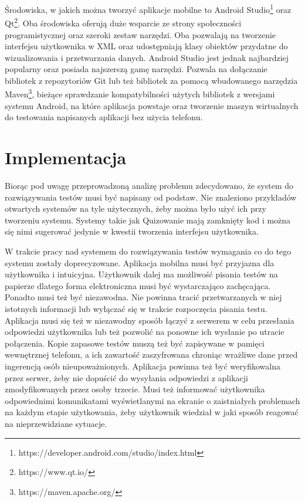 \documentclass{report}
\begin{document}
	Środowiska, w jakich można tworzyć aplikacje mobilne to Android Studio\footnote{https://developer.android.com/studio/index.html} oraz Qt\footnote{https://www.qt.io/}. Oba środowiska oferują duże wsparcie ze strony społeczności programistycznej oraz szeroki zestaw narzędzi. Oba pozwalają na tworzenie interfejsu użytkownika w XML oraz udostępniają klasy obiektów przydatne do wizualizowania i przetwarzania danych. Android Studio jest jednak najbardziej popularny oraz posiada najszerszą gamę narzędzi. Pozwala na dołączanie bibliotek z repozytoriów Git lub też bibliotek za pomocą wbudowanego narzędzia Maven\footnote{https://maven.apache.org/}, bieżące sprawdzanie kompatybilności użytych bibliotek z wersjami systemu Android, na które aplikacja powstaje oraz tworzenie maszyn wirtualnych do testowania napisanych aplikacji bez użycia telefonu.
	
	\chapter{Implementacja}
	
	
	Biorąc pod uwagę przeprowadzoną analizę problemu zdecydowano, że system do rozwiązywania testów musi być napisany od podstaw. Nie znaleziono przykładów otwartych systemów na tyle użytecznych, żeby można było użyć ich przy tworzeniu systemu. Systemy takie jak Quizowanie mają zamknięty kod i można się nimi sugerować jedynie w kwestii tworzenia interfejsu użytkownika.
	
	W trakcie pracy nad systemem do rozwiązywania testów wymagania co do tego systemu zostały doprecyzowane. Aplikacja mobilna musi być przyjazna dla użytkownika i intuicyjna. Użytkownik dalej ma możliwość pisania testów na papierze dlatego forma elektroniczna musi być wystarczająco zachęcająca. Ponadto musi też być niezawodna. Nie powinna tracić przetwarzanych w niej istotnych informacji lub wyłączać się w trakcie rozpoczęcia pisania testu. Aplikacja musi się też w niezawodny sposób łączyć z serwerem w celu przesłania odpowiedzi użytkownika lub też pozwolić na ponowne ich wysłanie po utracie połączenia. Kopie zapasowe testów muszą też być zapisywane w pamięci wewnętrznej telefonu, a ich zawartość zaszyfrowana chroniąc wrażliwe dane przed ingerencją osób nieupoważnionych. Aplikacja powinna też być weryfikowalna przez serwer, żeby nie dopuścić do wysyłania odpowiedzi z aplikacji zmodyfikowanych przez osoby trzecie. Musi też informować użytkownika odpowiednimi komunikatami wyświetlanymi na ekranie o zaistniałych problemach na każdym etapie użytkowania, żeby użytkownik wiedział w jaki sposób reagować na nieprzewidziane sytuacje.
	
\end{document}
